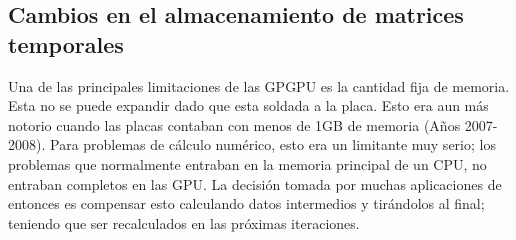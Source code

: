 %
%
%


\subsection{Cambios en el almacenamiento de matrices temporales}
Una de las principales limitaciones de las GPGPU es la cantidad fija de memoria. Esta no se puede
expandir dado que esta soldada a la placa. Esto era aun m\'as notorio cuando las placas
contaban con menos de 1GB de memoria (A\~nos 2007-2008).
Para problemas de c\'alculo num\'erico, esto era un limitante muy serio; los problemas que
normalmente entraban en la memoria principal de un CPU, no entraban completos en las GPU.
La decisi\'on tomada por muchas aplicaciones de entonces es compensar esto calculando
datos intermedios y tir\'andolos al final; teniendo que ser recalculados en las pr\'oximas iteraciones.


